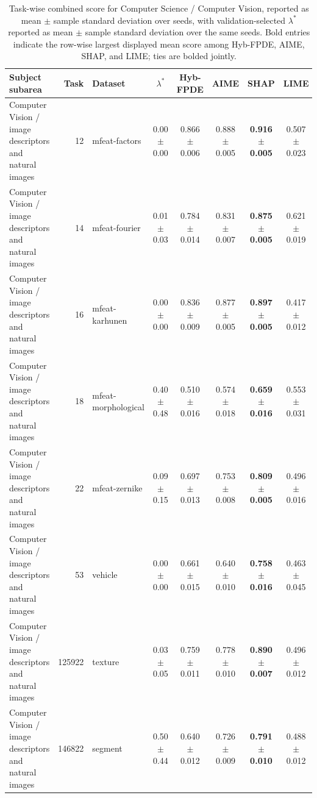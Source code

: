 \begin{table}[!tbp]
    \caption{Task-wise combined score for Computer Science / Computer Vision, reported as mean $\pm$ sample standard deviation over seeds, with validation-selected $\lambda^*$ reported as mean $\pm$ sample standard deviation over the same seeds. Bold entries indicate the row-wise largest displayed mean score among Hyb-FPDE, AIME, SHAP, and LIME; ties are bolded jointly.}
    \label{tab:taskwise_combined_scores_sd_computer_vision}
    \centering
    \scriptsize
    \setlength{\tabcolsep}{3pt}
    \renewcommand{\arraystretch}{1.03}
    \begin{tabular}{lrlccccc}
        \toprule
        Subject subarea & Task & Dataset & $\lambda^*$ & Hyb-FPDE & AIME & SHAP & LIME  \\
        \midrule
        Computer Vision / image descriptors and natural images & 12 & mfeat-factors & 0.00 $\pm$ 0.00 & 0.866 $\pm$ 0.006 & 0.888 $\pm$ 0.005 & \textbf{0.916 $\pm$ 0.005} & 0.507 $\pm$ 0.023 \\
        Computer Vision / image descriptors and natural images & 14 & mfeat-fourier & 0.01 $\pm$ 0.03 & 0.784 $\pm$ 0.014 & 0.831 $\pm$ 0.007 & \textbf{0.875 $\pm$ 0.005} & 0.621 $\pm$ 0.019 \\
        Computer Vision / image descriptors and natural images & 16 & mfeat-karhunen & 0.00 $\pm$ 0.00 & 0.836 $\pm$ 0.009 & 0.877 $\pm$ 0.005 & \textbf{0.897 $\pm$ 0.005} & 0.417 $\pm$ 0.012 \\
        Computer Vision / image descriptors and natural images & 18 & mfeat-morphological & 0.40 $\pm$ 0.48 & 0.510 $\pm$ 0.016 & 0.574 $\pm$ 0.018 & \textbf{0.659 $\pm$ 0.016} & 0.553 $\pm$ 0.031 \\
        Computer Vision / image descriptors and natural images & 22 & mfeat-zernike & 0.09 $\pm$ 0.15 & 0.697 $\pm$ 0.013 & 0.753 $\pm$ 0.008 & \textbf{0.809 $\pm$ 0.005} & 0.496 $\pm$ 0.016 \\
        Computer Vision / image descriptors and natural images & 53 & vehicle & 0.00 $\pm$ 0.00 & 0.661 $\pm$ 0.015 & 0.640 $\pm$ 0.010 & \textbf{0.758 $\pm$ 0.016} & 0.463 $\pm$ 0.045 \\
        Computer Vision / image descriptors and natural images & 125922 & texture & 0.03 $\pm$ 0.05 & 0.759 $\pm$ 0.011 & 0.778 $\pm$ 0.010 & \textbf{0.890 $\pm$ 0.007} & 0.496 $\pm$ 0.012 \\
        Computer Vision / image descriptors and natural images & 146822 & segment & 0.50 $\pm$ 0.44 & 0.640 $\pm$ 0.012 & 0.726 $\pm$ 0.009 & \textbf{0.791 $\pm$ 0.010} & 0.488 $\pm$ 0.012 \\

\end{tabular}
\end{table}
